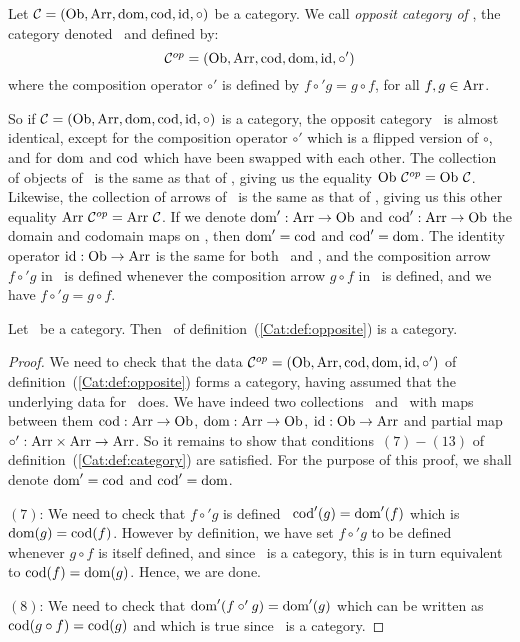 \begin{defin}\label{Cat:def:opposite}
    Let $\mbox{$\cal C$}=(\mbox{\rm Ob}, \mbox{\rm Arr}, \mbox{\rm dom},\mbox{\rm cod}, \mbox{\rm id}, \circ)$ be a category.
    We call {\em opposit category of \Cat}, the category denoted
    \Cop\ and defined by:
        \[
            \mbox{${\cal C}^{op}$}=(\mbox{\rm Ob}, \mbox{\rm Arr}, \mbox{\rm cod}, \mbox{\rm dom}, \mbox{\rm id}, \circ')
        \]
    where the composition operator $\circ'$ is defined by 
    $f \circ' g = g\circ f$, for all $f,g\in\mbox{\rm Arr}$.
\end{defin}

So if $\mbox{$\cal C$}=(\mbox{\rm Ob}, \mbox{\rm Arr}, \mbox{\rm dom},\mbox{\rm cod}, \mbox{\rm id}, \circ)$ is a category, the opposit
category \Cop\ is almost identical, except for the composition operator
$\circ'$ which is a flipped version of $\circ$, and for $\mbox{\rm dom}$ and $\mbox{\rm cod}$ 
which have been swapped with each other. The collection of objects of
\Cop\ is the same as that of \Cat, giving us the equality $\ob\ \Cop=\ob\ 
\Cat$. Likewise, the collection of arrows of \Cop\ is the same as that of 
\Cat, giving us this other equality $\arr\ \Cop=\arr\ \Cat$. If we denote
$\mbox{\rm dom}':\mbox{\rm Arr}\to\mbox{\rm Ob}$ and $\mbox{\rm cod}':\mbox{\rm Arr}\to\mbox{\rm Ob}$ the domain and codomain maps
on \Cop, then $\mbox{\rm dom}'=\mbox{\rm cod}$ and $\mbox{\rm cod}'=\mbox{\rm dom}$. The identity operator 
$\mbox{\rm id}:\mbox{\rm Ob}\to\mbox{\rm Arr}$ is the same for both \Cat\ and \Cop, and the composition
arrow $f\circ' g$ in \Cop\ is defined whenever the composition arrow
$g\circ f$ in \Cat\ is defined, and we have $f\circ' g= g \circ f$.

\begin{prop}\label{Cat:prop:opp:is:category}
    Let \Cat\ be a category. Then \Cop\ of 
    definition~(\ref{Cat:def:opposite}) is a category.
\end{prop}
\begin{proof}
    We need to check that the data $\mbox{${\cal C}^{op}$}=(\mbox{\rm Ob}, \mbox{\rm Arr}, \mbox{\rm cod}, \mbox{\rm dom}, \mbox{\rm id}, \circ')$ 
    of definition~(\ref{Cat:def:opposite}) forms a category, having assumed
    that the underlying data for \Cat\ does. We have indeed two collections 
    \ob\ and \arr\ with maps between them $\mbox{\rm cod}:\mbox{\rm Arr}\to\mbox{\rm Ob}$, $\mbox{\rm dom}:\mbox{\rm Arr}\to\mbox{\rm Ob}$, 
    $\mbox{\rm id}:\mbox{\rm Ob}\to\mbox{\rm Arr}$ and partial map $\circ':\mbox{\rm Arr}\times\mbox{\rm Arr}\to\mbox{\rm Arr}$. So it
    remains to show that conditions~$(7)-(13)$ of 
    definition~(\ref{Cat:def:category}) are satisfied. For the purpose of
    this proof, we shall denote $\mbox{\rm dom}'=\mbox{\rm cod}$ and $\mbox{\rm cod}'=\mbox{\rm dom}$.

    $(7)$: We need to check that $f\circ' g$ is defined \ifand\ 
    $\mbox{\rm cod}'(g)=\mbox{\rm dom}'(f)$ which is $\mbox{\rm dom}(g)=\mbox{\rm cod}(f)$. However by definition, 
    we have set $f\circ' g$ to be defined whenever $g\circ f$ is itself 
    defined, and since \Cat\ is a category, this is in turn equivalent 
    to $\mbox{\rm cod}(f)=\mbox{\rm dom}(g)$. Hence, we are done.

    $(8)$: We need to check that $\mbox{\rm dom}'(f\circ' g)=\mbox{\rm dom}'(g)$ which can be
    written as $\mbox{\rm cod}(g\circ f)=\mbox{\rm cod}(g)$ and which is true since \Cat\ is a
    category.
\end{proof}


